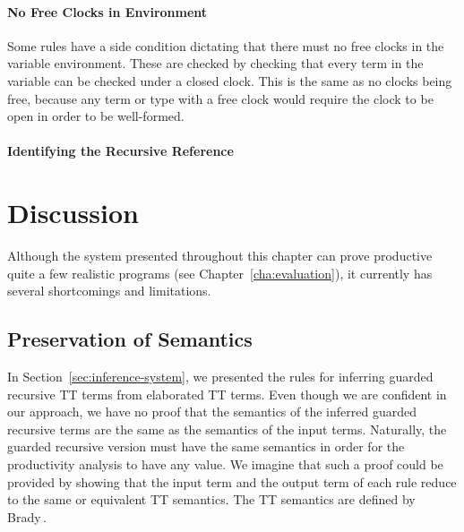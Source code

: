 \paragraph{No Free Clocks in Environment}
Some rules have a side condition dictating that there must no free clocks in the
variable environment. These are checked by checking that every term in the
variable can be checked under a closed clock. This is the same as no clocks
being free, because any term or type with a free clock would require the clock
to be open in order to be well-formed. 
\paragraph{Identifying the Recursive Reference}


\section{Discussion}
Although the system presented throughout this chapter can prove productive quite
a few realistic programs (see Chapter~\ref{cha:evaluation}), it currently has
several shortcomings and limitations.

\subsection{Preservation of Semantics}
In Section~\ref{sec:inference-system}, we presented the rules for inferring
guarded recursive TT terms from elaborated TT terms. Even though we are
confident in our approach, we have no proof that the semantics of the inferred
guarded recursive terms are the same as the semantics of the input
terms. Naturally, the guarded recursive version must have the same semantics in
order for the productivity analysis to have any value. We imagine that such a
proof could be provided by showing that the input term and the output term of each
rule reduce to the same or equivalent TT semantics. The TT
semantics are defined by Brady\,\citep{BradyIdrisImpl13}.

